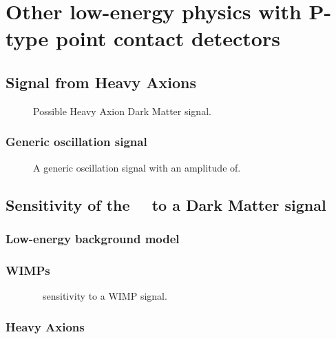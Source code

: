 \chapter{Other low-energy physics with P-type point contact detectors}

		
	\section{Signal from Heavy Axions}
	\label{sec:CalcLimitsOnHeavyAxions}		
		
		\begin{figure}
			\centering
			\caption{Possible Heavy Axion Dark Matter signal.}
			\label{fig:HeavyAxionSignal}
		\end{figure}
				
	\subsection{Generic oscillation signal}
	\label{sec:CalcLimitsOnGenericalOscillationSignal}		
		
		\begin{figure}
			\centering
			\caption{A generic oscillation signal with an amplitude of.}
			\label{fig:GenericOscillationSignal}
		\end{figure}
		
							
	\section{Sensitivity of the \MJ~\minmod~to a Dark Matter signal}
		\subsection{Low-energy background model}
		\label{sec:MJLowEnergyBackgroundModel}
		\subsection{WIMPs}
		\label{sec:MJSensitivityToWIMP}
		
			\begin{figure}
				\centering
				\caption{\MJ~\minmod~sensitivity to a WIMP signal.}
				\label{fig:MJSensitivityToWIMP}
			\end{figure}		
		\subsection{Heavy Axions}
		\label{sec:MJSensitivityToAxions}
		

